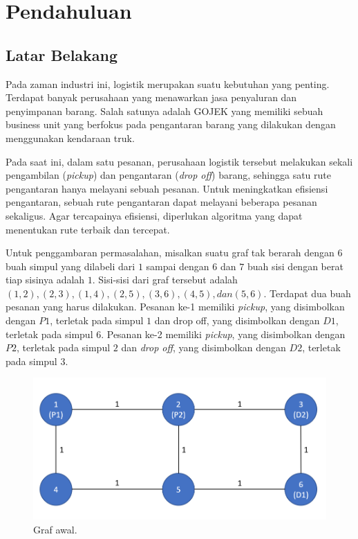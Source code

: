 \chapter{Pendahuluan}

\section{Latar Belakang}

Pada zaman industri ini, logistik merupakan suatu kebutuhan yang penting. Terdapat banyak perusahaan yang menawarkan jasa penyaluran dan penyimpanan barang.
Salah satunya adalah GOJEK yang memiliki sebuah business unit yang berfokus pada pengantaran barang yang dilakukan dengan menggunakan kendaraan truk.

Pada saat ini, dalam satu pesanan, perusahaan logistik tersebut melakukan sekali pengambilan (\textit{pickup}) dan pengantaran (\textit{drop off}) barang,
sehingga satu rute pengantaran hanya melayani sebuah pesanan. Untuk meningkatkan efisiensi pengantaran, sebuah rute pengantaran dapat melayani beberapa pesanan sekaligus.
Agar tercapainya efisiensi, diperlukan algoritma yang dapat menentukan rute terbaik dan tercepat.

Untuk penggambaran permasalahan, misalkan suatu graf tak berarah dengan $6$ buah simpul yang dilabeli dari $1$ sampai dengan $6$ dan $7$ buah sisi dengan berat tiap sisinya adalah $1$.
Sisi-sisi dari graf tersebut adalah $(1,2), (2,3), (1,4), (2,5), (3,6), (4,5), dan (5,6)$. Terdapat dua buah pesanan yang harus dilakukan. Pesanan ke-1 memiliki \textit{pickup},
yang disimbolkan dengan $P1$, terletak pada simpul $1$ dan drop off, yang disimbolkan dengan $D1$, terletak pada simpul $6$. Pesanan ke-2 memiliki \textit{pickup}, yang
disimbolkan dengan $P2$, terletak pada simpul $2$ dan \textit{drop off}, yang disimbolkan dengan $D2$, terletak pada simpul $3$.

\begin{figure}[H]
    \centering
    \includegraphics[width=1.0\textwidth]{resources/graph_init.png}
    \caption{Graf awal.}
\end{figure}

